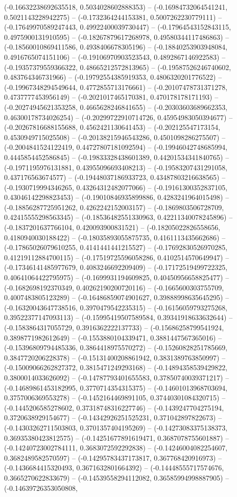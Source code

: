 (-0.16632238692635518, 0.5034028602888353) -- (-0.16984732064541241, 0.5021143228942275) -- (-0.1732364244153381, 0.5007262230779111) -- (-0.17649970589247443, 0.49922400039730447) -- (-0.17964543152843115, 0.4975900131910595) -- (-0.18267879617268978, 0.49580344117486863) -- (-0.18560010869411586, 0.4938406678305196) -- (-0.18840253903948084, 0.4916765074151106) -- (-0.19106970903523543, 0.4892867146922583) -- (-0.19357379559366322, 0.48665212572813965) -- (-0.19587526246740602, 0.483764346731966) -- (-0.19792554385919353, 0.4806320201776522) -- (-0.19967348294549644, 0.4772855713176661) -- (-0.20107478731371278, 0.4737777453956149) -- (-0.2021017465170381, 0.470178178171193) -- (-0.20274945621353258, 0.4665628246841655) -- (-0.20303603689662353, 0.46300178734026254) -- (-0.20299722910714726, 0.45954983050394677) -- (-0.20267816688155688, 0.4562421130641453) -- (-0.202125547173154, 0.4530949715025508) -- (-0.20138215946543286, 0.4501098286275507) -- (-0.2004841524122419, 0.44727807181092594) -- (-0.19946042748685994, 0.4445854452586845) -- (-0.19833328438601389, 0.44201534341840765) -- (-0.1971195976131881, 0.43955096693408213) -- (-0.19583207431291058, 0.437176563674577) -- (-0.19448037186933723, 0.43487803216638565) -- (-0.1930719994346265, 0.43264312482077066) -- (-0.19161300352837105, 0.43046142298823453) -- (-0.19010846935899886, 0.4283241964015498) -- (-0.18856287725951262, 0.4262242152003157) -- (-0.1869803506728709, 0.42415555298563345) -- (-0.18536482551330963, 0.42211340078245896) -- (-0.1837201637766104, 0.420093900831521) -- (-0.18205022826558656, 0.4180940030188422) -- (-0.18035893055875735, 0.4161113435662686) -- (-0.17865026079610255, 0.4141441441215527) -- (-0.17692830526970285, 0.41219112884700115) -- (-0.17519725596058286, 0.4102514570649947) -- (-0.17346141485977679, 0.4083246692209409) -- (-0.17172519499722325, 0.40641064422795975) -- (-0.1699931194609825, 0.40450956658825477) -- (-0.1682698192370349, 0.40262190200720116) -- (-0.1665600303755709, 0.4007483805123289) -- (-0.16486859074901627, 0.39888998635645295) -- (-0.16320043647738516, 0.3970479542235315) -- (-0.16156059793275268, 0.39522377147093113) -- (-0.15995419507589584, 0.39341918633632644) -- (-0.1583864317055729, 0.3916362222137733) -- (-0.15686258799541924, 0.3898771982612649) -- (-0.1553880104339471, 0.3881447567365016) -- (-0.15396809794485336, 0.3864418975570272) -- (-0.15260828251785669, 0.3847720206228378) -- (-0.15131400208861942, 0.3831389763850997) -- (-0.15009066262827372, 0.3815471249293168) -- (-0.14894358539429822, 0.3800014033626092) -- (-0.14787793401655583, 0.37850740039371217) -- (-0.14689861453182995, 0.3770714354315375) -- (-0.14601013968703694, 0.3757006369553278) -- (-0.1452164469891105, 0.37440301084320715) -- (-0.1445206585278602, 0.37318748316227746) -- (-0.1439247704275194, 0.3720638929154677) -- (-0.14342926251525231, 0.371042897822673) -- (-0.14303262711503803, 0.3701357404195269) -- (-0.14273083375138373, 0.36935380423812575) -- (-0.14251677891619471, 0.3687078755601887) -- (-0.14240723002784111, 0.3683072592292838) -- (-0.14246004082254607, 0.3682489582570597) -- (-0.14295783437173817, 0.367768420916973) -- (-0.1436684415320493, 0.3671632801664392) -- (-0.14448555717574676, 0.3665270622833679) -- (-0.14539558294112082, 0.36585994998887905) -- (-0.14639726353050808, 